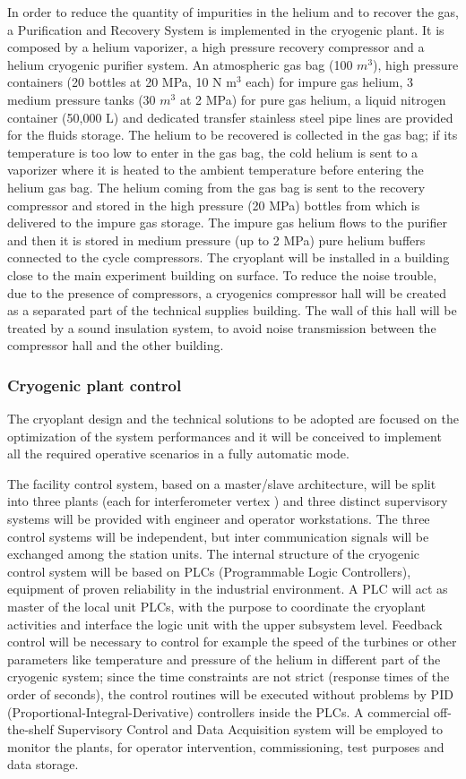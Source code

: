 In order to reduce the quantity of impurities in the helium and to recover the gas, a Purification and Recovery System is implemented in the cryogenic plant. It is composed by a helium vaporizer, a high pressure recovery compressor and a helium cryogenic purifier system. An atmospheric gas bag (100 $m^3$), high pressure containers (20 bottles at 20 MPa, 10 N m$^3$ each) for impure gas helium, 3 medium pressure tanks (30 $m^3$ at 2 MPa) for pure gas helium, a liquid nitrogen container (50,000 L) and dedicated transfer stainless steel pipe lines are provided for the fluids storage. The helium to be recovered is collected in the gas bag; if its temperature is too low to enter in the gas bag, the cold helium is sent to a vaporizer where it is heated to the ambient temperature before entering the helium gas bag. The helium coming from the gas bag is sent to the recovery compressor and stored in the high pressure (20 MPa) bottles from which is delivered to the impure gas storage. The impure gas helium flows to the purifier and then it is stored in medium pressure (up to 2 MPa) pure helium buffers connected to the cycle compressors. The cryoplant will be installed in a building close to the main experiment building on surface. To reduce the noise trouble, due to the presence of compressors, a cryogenics compressor hall will be created as a separated part of the technical supplies building. The wall of this hall will be treated by a sound insulation system, to avoid noise transmission between the compressor hall and the other building. 

\subsubsection{Cryogenic plant control}
The cryoplant design and the technical solutions to be adopted are focused on the optimization of the system performances and it will be conceived to implement all the required operative scenarios in a fully automatic mode. 

The facility control system, based on a master/slave architecture, will be split into three plants (each for interferometer vertex ) and three distinct supervisory systems will be provided with engineer and operator workstations. The three control systems will be independent, but inter communication signals will be exchanged among the station units. The internal structure of the cryogenic control system will be based on PLCs (Programmable Logic Controllers), equipment of proven reliability in the industrial environment. A PLC will act as master of the local unit PLCs, with the purpose to coordinate the cryoplant activities and interface the logic unit with the upper subsystem level. Feedback control will be necessary to control for example the speed of the turbines or other parameters like temperature and pressure of the helium in different part of the cryogenic system; since the time constraints are not strict (response times of the order of seconds), the control routines will be executed without problems by PID (Proportional-Integral-Derivative) controllers inside the PLCs. A commercial off-the-shelf Supervisory Control and Data Acquisition system will be employed to monitor the plants, for operator intervention, commissioning, test purposes and data storage. 
